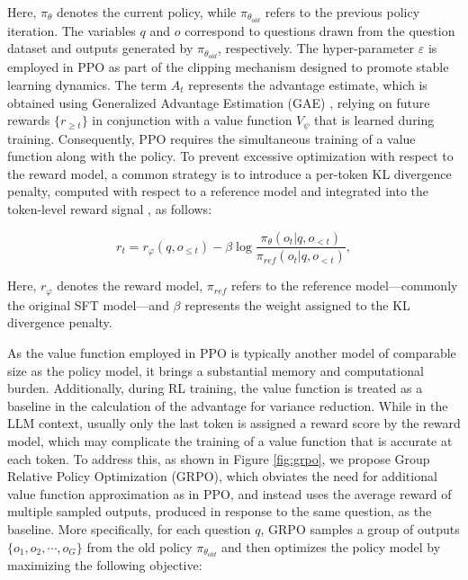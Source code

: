 \begin{itemize}[topsep=0pt]
\begin{itemize}[topsep=0pt]
Here, $\pi_{\theta}$ denotes the current policy, while $\pi_{\theta_{old}}$ refers to the previous policy iteration. The variables $q$ and $o$ correspond to questions drawn from the question dataset and outputs generated by $\pi_{\theta_{old}}$, respectively. The hyper-parameter $\varepsilon$ is employed in PPO as part of the clipping mechanism designed to promote stable learning dynamics. The term $A_t$ represents the advantage estimate, which is obtained using Generalized Advantage Estimation (GAE) \citep{gae}, relying on future rewards $\{r_{\ge t}\}$ in conjunction with a value function $V_{\psi}$ that is learned during training. Consequently, PPO requires the simultaneous training of a value function along with the policy. To prevent excessive optimization with respect to the reward model, a common strategy is to introduce a per-token KL divergence penalty, computed with respect to a reference model and integrated into the token-level reward signal \citep{ouyang2022training}, as follows:

\begin{equation}
    r_{t} = r_\varphi(q, o_{\le t}) - \beta \log\frac{\pi_{\theta}(o_{t}|q, o_{<t})}{\pi_{ref}(o_{t}|q, o_{<t})},
\label{eq:PPO-reward}
\end{equation}

Here, $r_\varphi$ denotes the reward model, $\pi_{ref}$ refers to the reference model—commonly the original SFT model—and $\beta$ represents the weight assigned to the KL divergence penalty.

As the value function employed in PPO is typically another model of comparable size as the policy model, it brings a substantial memory and computational burden. Additionally, during RL training, the value function is treated as a baseline in the calculation of the advantage for variance reduction. While in the LLM context, usually only the last token is assigned a reward score by the reward model, which may complicate the training of a value function that is accurate at each token. To address this, as shown in Figure \ref{fig:grpo}, we propose Group Relative Policy Optimization (GRPO), which obviates the need for additional value function approximation as in PPO, and instead uses the average reward of multiple sampled outputs, produced in response to the same question, as the baseline. More specifically, for each question $q$, GRPO samples a group of outputs $\{o_1, o_2, \cdots, o_G\}$  from the old policy  $\pi_{\theta_{old}}$  and then optimizes the policy model by maximizing the following objective:


\end{itemize}
\end{itemize}
